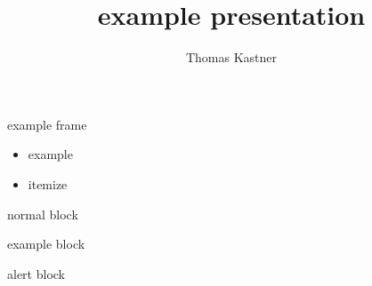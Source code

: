 \documentclass{beamer}
\title{example presentation}
\author{Thomas Kastner}
\begin{document}
    {
    \begin{frame}
        \titlepage
    \end{frame}
    }

    \begin{frame}{example frame}
        \begin{itemize}
          \item example
          \item itemize
        \end{itemize}

        \begin{block}{normal}
          block
        \end{block}

        \begin{exampleblock}{example}
          block
        \end{exampleblock}

        \begin{alertblock}{alert}
          block
        \end{alertblock}
    \end{frame}
\end{document}
